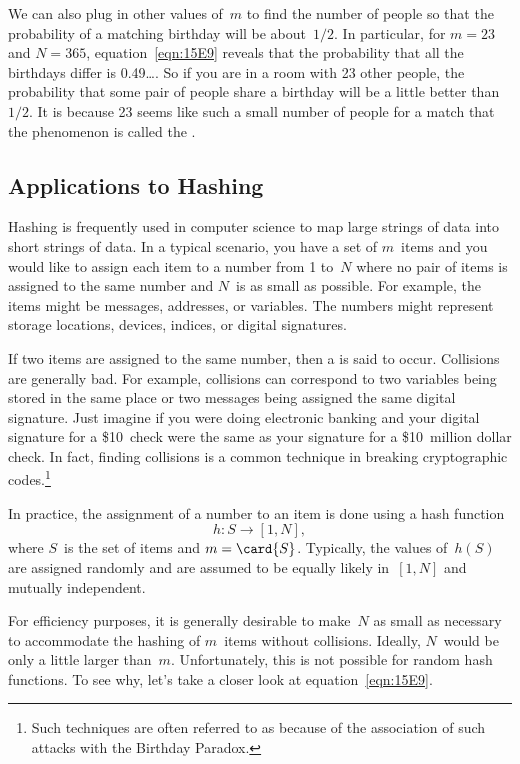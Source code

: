 We can also plug in other values of~$m$ to find the number of people
so that the probability of a matching birthday will be about~$1/2$.
In particular, for $m = 23$ and $N = 365$, equation~\eqref{eqn:15E9}
reveals that the probability that all the birthdays differ is
0.49\dots.  So if you are in a room with 23 other people, the
probability that some pair of people share a birthday will be a little
better than~$1/2$.  It is because 23 seems like such a small number of
people for a match that the phenomenon is called the .

\subsection{Applications to Hashing}

Hashing is frequently used in computer science to map large strings of
data into short strings of data.  In a typical scenario, you have a
set of $m$~items and you would like to assign each item to a number
from 1 to~$N$ where no pair of items is assigned to the same number
and $N$~is as small as possible.  For example, the items might be
messages, addresses, or variables.  The numbers might represent
storage locations, devices, indices, or digital signatures.

If two items are assigned to the same number, then a 
is said to occur.  Collisions are generally bad.  For example,
collisions can correspond to two variables being stored in the same
place or two messages being assigned the same digital signature.  Just
imagine if you were doing electronic banking and your digital
signature for a \$10~check were the same as your signature for a
\$10~million dollar check.  In fact, finding collisions is a common
technique in breaking cryptographic codes.\footnote{Such techniques
  are often referred to as  because of the
  association of such attacks with the Birthday Paradox.}

In practice, the assignment of a number to an item is done using a
hash function
\begin{equation*}
    h: S \to [1, N],
\end{equation*}
where $S$~is the set of items and $m = \card{S}$.  Typically, the
values of~$h(S)$ are assigned randomly and are assumed to be equally
likely in~$[1, N]$ and mutually independent.

For efficiency purposes, it is generally desirable to make~$N$ as
small as necessary to accommodate the hashing of $m$~items without
collisions.  Ideally, $N$~would be only a little larger than~$m$.
Unfortunately, this is not possible for random hash functions.  To see
why, let's take a closer look at equation~\eqref{eqn:15E9}.

